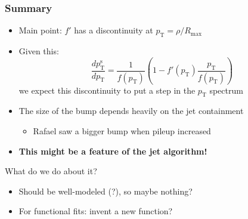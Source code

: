 \documentclass[xcolor={table}]{beamer}
\newcommand{\pt}{p_{\mathrm{T}}}
\newcommand{\ptr}{\pt}
\newcommand{\ptt}{\pt^{\text{s}}}
\begin{document}
\begin{frame}
  \frametitle{Summary}
  \begin{itemize}
  \item Main point: $f'$ has a discontinuity at $\ptr = \rho / R_{\text{max}}$
  \item Given this:
    \[ \frac{d\ptt}{d\ptr} = \frac{1}{f(\ptr)} \left( 1 - f'(\ptr) \frac{\ptr}{f(\ptr)} \right) \]
    we expect this discontinuity to put a step in the $\ptr$ spectrum
  \item The size of the bump depends heavily on the jet containment
    \begin{itemize}
    \item Rafael saw a bigger bump when pileup increased
    \end{itemize}
  \item \textbf{This might be a feature of the jet algorithm!}
  \end{itemize}
  \begin{block}{What do we do about it?}
    \begin{itemize}
    \item Should be well-modeled (?), so maybe nothing?
    \item For functional fits: invent a new function?
    \end{itemize}
  \end{block}
\end{frame}



\end{document}
